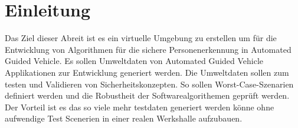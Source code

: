 \chapter{Einleitung}
Das Ziel dieser Abreit ist es ein virtuelle Umgebung zu erstellen um für die Entwicklung von Algorithmen für die sichere Personenerkennung in Automated Guided Vehicle. 
Es sollen Umweltdaten von Automated Guided Vehicle Applikationen zur Entwicklung generiert werden. Die Umweltdaten sollen zum testen und Validieren von Sicherheitskonzepten. So sollen Worst-Case-Szenarien definiert werden und die Robustheit der Softwarealgorithemen geprüft werden.\\

Der Vorteil ist es das so viele mehr testdaten generiert werden könne ohne aufwendige Test Scenerien in einer realen Werkshalle aufzubauen.\\


